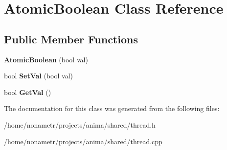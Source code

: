 \hypertarget{classAtomicBoolean}{
\section{AtomicBoolean Class Reference}
\label{classAtomicBoolean}
}
\subsection*{Public Member Functions}
\begin{DoxyCompactItemize}
\item 
\hypertarget{classAtomicBoolean_a562a704c03897cbaf8f95b73d1e63df0}{
{\bfseries AtomicBoolean} (bool val)}
\label{classAtomicBoolean_a562a704c03897cbaf8f95b73d1e63df0}

\item 
\hypertarget{classAtomicBoolean_ad96cc644e40c345085a0712240acb268}{
bool {\bfseries SetVal} (bool val)}
\label{classAtomicBoolean_ad96cc644e40c345085a0712240acb268}

\item 
\hypertarget{classAtomicBoolean_ac2bf4025564e2c37e071ae96d6918f4a}{
bool {\bfseries GetVal} ()}
\label{classAtomicBoolean_ac2bf4025564e2c37e071ae96d6918f4a}

\end{DoxyCompactItemize}


The documentation for this class was generated from the following files:\begin{DoxyCompactItemize}
\item 
/home/nonametr/projects/anima/shared/thread.h\item 
/home/nonametr/projects/anima/shared/thread.cpp\end{DoxyCompactItemize}
